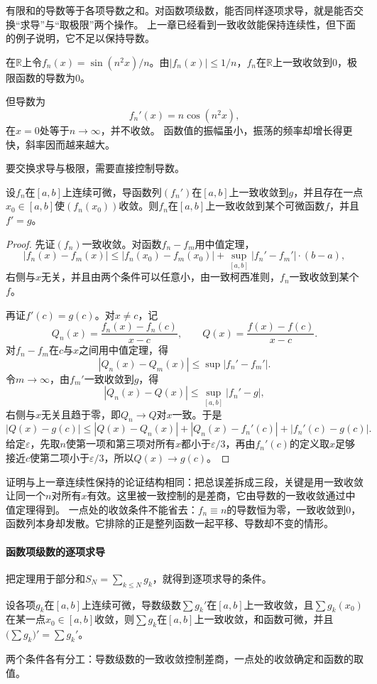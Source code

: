 有限和的导数等于各项导数之和。对函数项级数，能否同样逐项求导，就是能否交换“求导”与“取极限”两个操作。
上一章已经看到一致收敛能保持连续性，但下面的例子说明，它不足以保持导数。
\begin{example}[一致收敛而导数不收敛的函数列]
\label{ex:ru-uniform-not-derivative}
在$\mathbb R$上令$f_n(x)=\sin(n^2x)/n$。由$|f_n(x)|\leq1/n$，$f_n$在$\mathbb R$上一致收敛到$0$，极限函数的导数为$0$。

但导数为
\[
 f_n'(x)=n\cos(n^2x),
\]
在$x=0$处等于$n\to\infty$，并不收敛。
函数值的振幅虽小，振荡的频率却增长得更快，斜率因而越来越大。
\end{example}
要交换求导与极限，需要直接控制导数。
\begin{theorem}[函数列的求导与极限交换]
\label{thm:ru-uniform-derivative-limit}
设$f_n$在$[a,b]$上连续可微，导函数列$(f_n')$在$[a,b]$上一致收敛到$g$，并且存在一点$x_0\in[a,b]$使$(f_n(x_0))$收敛。则$f_n$在$[a,b]$上一致收敛到某个可微函数$f$，并且$f'=g$。
\end{theorem}
\begin{proof}
先证$(f_n)$一致收敛。对函数$f_n-f_m$用中值定理，
\[
 |f_n(x)-f_m(x)|\leq|f_n(x_0)-f_m(x_0)|+\sup_{[a,b]}|f_n'-f_m'|\cdot(b-a),
\]
右侧与$x$无关，并且由两个条件可以任意小，由一致柯西准则，$f_n$一致收敛到某个$f$。

再证$f'(c)=g(c)$。对$x\neq c$，记
\[
 Q_n(x)=\frac{f_n(x)-f_n(c)}{x-c},\qquad Q(x)=\frac{f(x)-f(c)}{x-c}.
\]
对$f_n-f_m$在$c$与$x$之间用中值定理，得
\[
 |Q_n(x)-Q_m(x)|\leq\sup|f_n'-f_m'|.
\]
令$m\to\infty$，由$f_m'$一致收敛到$g$，得
\[
 |Q_n(x)-Q(x)|\leq\sup_{[a,b]}|f_n'-g|,
\]
右侧与$x$无关且趋于零，即$Q_n\to Q$对$x$一致。于是
\[
 |Q(x)-g(c)|\leq|Q(x)-Q_n(x)|+|Q_n(x)-f_n'(c)|+|f_n'(c)-g(c)|.
\]
给定$\varepsilon$，先取$n$使第一项和第三项对所有$x$都小于$\varepsilon/3$，再由$f_n'(c)$的定义取$x$足够接近$c$使第二项小于$\varepsilon/3$，所以$Q(x)\to g(c)$。
\end{proof}
证明与上一章连续性保持的论证结构相同：把总误差拆成三段，关键是用一致收敛让同一个$n$对所有$x$有效。这里被一致控制的是差商，它由导数的一致收敛通过中值定理得到。
一点处的收敛条件不能省去：$f_n\equiv n$的导数恒为零，一致收敛到$0$，函数列本身却发散。它排除的正是整列函数一起平移、导数却不变的情形。

\paragraph{函数项级数的逐项求导}
把定理用于部分和$S_N=\sum_{k\leq N}g_k$，就得到逐项求导的条件。
\begin{theorem}[函数项级数的逐项求导]
\label{thm:ru-termwise-derivative}
设各项$g_k$在$[a,b]$上连续可微，导数级数$\sum g_k'$在$[a,b]$上一致收敛，且$\sum g_k(x_0)$在某一点$x_0\in[a,b]$收敛，则$\sum g_k$在$[a,b]$上一致收敛，和函数可微，并且$\bigl(\sum g_k\bigr)'=\sum g_k'$。
\end{theorem}
两个条件各有分工：导数级数的一致收敛控制差商，一点处的收敛确定和函数的取值。

